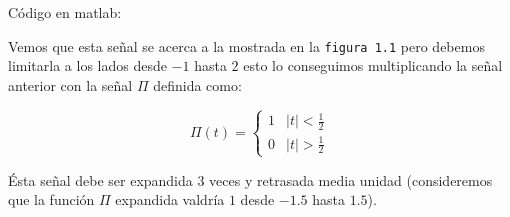 \documentclass[10pt,a4paper]{report}
\begin{document}
Código en matlab:



Vemos que esta señal se acerca a la mostrada en la \texttt{figura 1.1} pero debemos limitarla a los lados desde $ -1 $ hasta $2$ esto lo conseguimos multiplicando la señal anterior con la señal $\Pi$ definida como:

\[ \Pi(t) = \left\{
              \begin{array}{lc}
                1&\left|t\right|<\frac12\\
                0&\left|t\right|>\frac12
              \end{array}
            \right.
\]

Ésta señal debe ser expandida 3 veces y retrasada media unidad (consideremos que la función $\Pi$ expandida valdría $1$ desde $-1.5$ hasta $1.5$).
\end{document}
